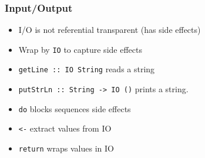 \subsubsection{Input/Output}
\begin{itemize}
    \item I/O is not referential transparent (has side effects)
    \item Wrap by \verb+IO+ to capture side effects
    \item \verb+getLine :: IO String+ reads a string
    \item \verb+putStrLn :: String -> IO ()+ prints a string.
    \item \verb+do+ blocks sequences side effects
    \item \verb+<-+ extract values from IO
    \item \verb+return+ wraps values in IO
\end{itemize}
